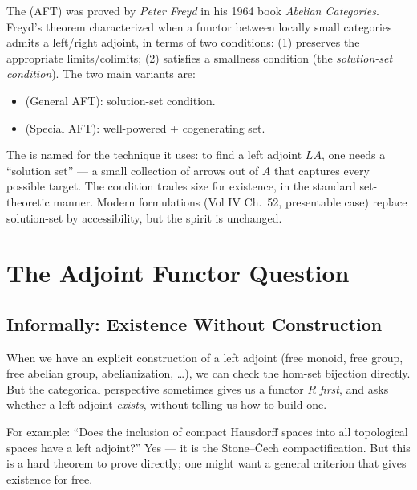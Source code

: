 \begin{nameorigin}
The  (AFT) was proved by \emph{Peter
Freyd} in his 1964 book \emph{Abelian Categories}. Freyd's theorem
characterized when a functor between locally small categories admits a
left/right adjoint, in terms of two conditions: (1) preserves the
appropriate limits/colimits; (2) satisfies a smallness condition
(the \emph{solution-set condition}). The two main variants are:

\begin{itemize}
  \item {} (General AFT): solution-set condition.
  \item {} (Special AFT): well-powered + cogenerating set.
\end{itemize}

The  is named for the technique it uses:
to find a left adjoint $L A$, one needs a ``solution set'' — a small
collection of arrows out of $A$ that captures every possible target.
The condition trades size for existence, in the standard set-theoretic
manner. Modern formulations (Vol IV Ch.~52, presentable case) replace
solution-set by accessibility, but the spirit is unchanged.
\end{nameorigin}

\section{The Adjoint Functor Question}
\label{sec:aft-question}

\subsection{Informally: Existence Without Construction}

When we have an explicit construction of a left adjoint (free monoid,
free group, free abelian group, abelianization, \ldots), we can check
the hom-set bijection directly. But the categorical perspective sometimes
gives us a functor $R$ \emph{first}, and asks whether a left adjoint
\emph{exists}, without telling us how to build one.

For example: ``Does the inclusion of compact Hausdorff spaces into all
topological spaces have a left adjoint?'' Yes --- it is the
Stone--\v{C}ech compactification. But this is a hard theorem to prove
directly; one might want a general criterion that gives existence for
free.


